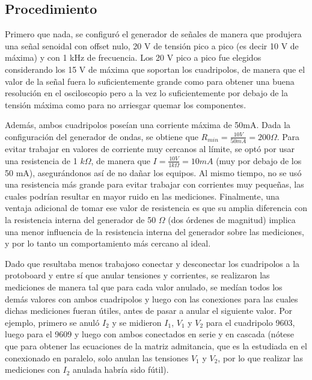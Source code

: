     \subsection{Procedimiento}
    
    Primero que nada, se configuró el generador de señales de manera que produjera una señal senoidal con offset nulo, 20 V de tensión
    pico a pico (es decir 10 V de máxima) y con 1 kHz de frecuencia. Los 20 V pico a pico fue elegidos considerando los 15 V de máxima
    que soportan los cuadripolos, de manera que el valor de la señal fuera lo suficientemente grande como para obtener una buena 
    resolución en el osciloscopio pero a la vez lo suficientemente por debajo de la tensión máxima como para no arriesgar quemar los
    componentes. 
    
    
    Además, ambos cuadripolos poseían una corriente máxima de 50mA. Dada la configuración del generador de ondas, se obtiene que  
    $R_{min} = \frac{10 V}{50 mA} = 200 \Omega$. Para evitar trabajar en valores de corriente muy cercanos al límite, se optó por
    usar una resistencia de 1 $k\Omega$, de manera que $ I = \frac{10 V}{1 k\Omega} = 10 mA $ (muy por debajo de los 50 mA), 
    asegurándonos así de no dañar los equipos. Al mismo tiempo, no se usó una resistencia más grande para evitar trabajar con
    corrientes muy pequeñas, las cuales podrían resultar en mayor ruido en las mediciones. Finalmente, una ventaja adicional de tomar
    ese valor de resistencia es que su amplia diferencia con la resistencia interna del generador de 50 $ \Omega $ (dos órdenes de
    magnitud) implica una menor influencia de la resistencia interna del generador sobre las mediciones, y por lo tanto un comportamiento
    más cercano al ideal.

    \par Dado que resultaba menos trabajoso conectar y desconectar los cuadripolos a la protoboard y entre sí que anular tensiones y
    corrientes, se realizaron las mediciones de manera tal que para cada valor anulado, se medían todos los demás valores con ambos
    cuadripolos y luego con las conexiones para las cuales dichas mediciones fueran útiles, antes de pasar a anular el siguiente valor.
    Por ejemplo, primero se anuló $ I_2 $ y se midieron $ I_1 $, $ V_1 $ y $ V_2 $ para el cuadripolo 9603, luego 
    para el 9609 y luego con ambos conectados en serie y en cascada (nótese que para obtener las ecuaciones de la matriz admitancia, 
    que es la estudiada en el conexionado en paralelo, solo anulan las tensiones $ V_1 $ y $ V_2 $, por lo que realizar las mediciones
    con $ I_2 $ anulada habría sido fútil).

